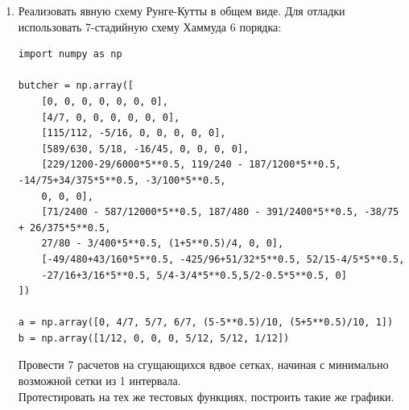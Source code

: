 \documentclass{article}
\begin{document}
\begin{enumerate}
\begin{verbatim}
def f(t, u):
    om = np.array([np.sin(t), np.cos(t), np.sin(t + np.pi/4)])
    Omega = np.array([[0, -om[2], om[1]],
                      [om[2], 0, -om[0]],
                      [-om[1], om[0], 0]])
    return np.dot(Omega, u)
\end{verbatim}
Начальное условие: $u_0 = [1; -0.5; 0.6];$\\
Временной отрезок для обеих функций - от 0 до 1.\\
Провести 7 расчетов на сгущающихся вдвое сетках, начиная с минимально возможной сетки из 1 интервала.\\
Для первой функции построить график эффективного порядка метода от числа интервалов сетки (по последнему узлу, т.е. в последнем узле сетки при $t=1$), для второй - построить график решения (3 кривые на одном графике). 
\item Реализовать явную схему Рунге-Кутты в общем виде. Для отладки использовать 7-стадийную схему Хаммуда 6 порядка:

\newpage

\begin{verbatim}
import numpy as np

butcher = np.array([
    [0, 0, 0, 0, 0, 0, 0],
    [4/7, 0, 0, 0, 0, 0, 0],
    [115/112, -5/16, 0, 0, 0, 0, 0],
    [589/630, 5/18, -16/45, 0, 0, 0, 0],
    [229/1200-29/6000*5**0.5, 119/240 - 187/1200*5**0.5, -14/75+34/375*5**0.5, -3/100*5**0.5,
    0, 0, 0],
    [71/2400 - 587/12000*5**0.5, 187/480 - 391/2400*5**0.5, -38/75 + 26/375*5**0.5,
    27/80 - 3/400*5**0.5, (1+5**0.5)/4, 0, 0],
    [-49/480+43/160*5**0.5, -425/96+51/32*5**0.5, 52/15-4/5*5**0.5,
    -27/16+3/16*5**0.5, 5/4-3/4*5**0.5,5/2-0.5*5**0.5, 0]
])

a = np.array([0, 4/7, 5/7, 6/7, (5-5**0.5)/10, (5+5**0.5)/10, 1])
b = np.array([1/12, 0, 0, 0, 5/12, 5/12, 1/12])

\end{verbatim}
Провести 7 расчетов на сгущающихся вдвое сетках, начиная с минимально возможной сетки из 1 интервала.\\
Протестировать на тех же тестовых функциях, построить такие же графики.
\end{enumerate}
\end{document}
